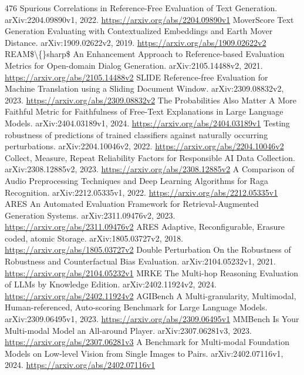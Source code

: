 \documentclass[11pt]{article}
\begin{document}
\begin{thebibliography}{476}
 Spurious Correlations in Reference-Free Evaluation of Text Generation. arXiv:2204.09890v1, 2022. \url{https://arxiv.org/abs/2204.09890v1}
 MoverScore Text Generation Evaluating with Contextualized Embeddings and Earth Mover Distance. arXiv:1909.02622v2, 2019. \url{https://arxiv.org/abs/1909.02622v2}
 REAM\$\textbackslash\{\}sharp\$ An Enhancement Approach to Reference-based Evaluation Metrics for Open-domain Dialog Generation. arXiv:2105.14488v2, 2021. \url{https://arxiv.org/abs/2105.14488v2}
 SLIDE Reference-free Evaluation for Machine Translation using a Sliding Document Window. arXiv:2309.08832v2, 2023. \url{https://arxiv.org/abs/2309.08832v2}
 The Probabilities Also Matter A More Faithful Metric for Faithfulness of Free-Text Explanations in Large Language Models. arXiv:2404.03189v1, 2024. \url{https://arxiv.org/abs/2404.03189v1}
 Testing robustness of predictions of trained classifiers against naturally occurring perturbations. arXiv:2204.10046v2, 2022. \url{https://arxiv.org/abs/2204.10046v2}
 Collect, Measure, Repeat Reliability Factors for Responsible AI Data Collection. arXiv:2308.12885v2, 2023. \url{https://arxiv.org/abs/2308.12885v2}
 A Comparison of Audio Preprocessing Techniques and Deep Learning Algorithms for Raga Recognition. arXiv:2212.05335v1, 2022. \url{https://arxiv.org/abs/2212.05335v1}
 ARES An Automated Evaluation Framework for Retrieval-Augmented Generation Systems. arXiv:2311.09476v2, 2023. \url{https://arxiv.org/abs/2311.09476v2}
 ARES Adaptive, Reconfigurable, Erasure coded, atomic Storage. arXiv:1805.03727v2, 2018. \url{https://arxiv.org/abs/1805.03727v2}
 Double Perturbation On the Robustness of Robustness and Counterfactual Bias Evaluation. arXiv:2104.05232v1, 2021. \url{https://arxiv.org/abs/2104.05232v1}
 MRKE The Multi-hop Reasoning Evaluation of LLMs by Knowledge Edition. arXiv:2402.11924v2, 2024. \url{https://arxiv.org/abs/2402.11924v2}
 AGIBench A Multi-granularity, Multimodal, Human-referenced, Auto-scoring Benchmark for Large Language Models. arXiv:2309.06495v1, 2023. \url{https://arxiv.org/abs/2309.06495v1}
 MMBench Is Your Multi-modal Model an All-around Player. arXiv:2307.06281v3, 2023. \url{https://arxiv.org/abs/2307.06281v3}
 A Benchmark for Multi-modal Foundation Models on Low-level Vision from Single Images to Pairs. arXiv:2402.07116v1, 2024. \url{https://arxiv.org/abs/2402.07116v1}

\end{thebibliography}
\end{document}
